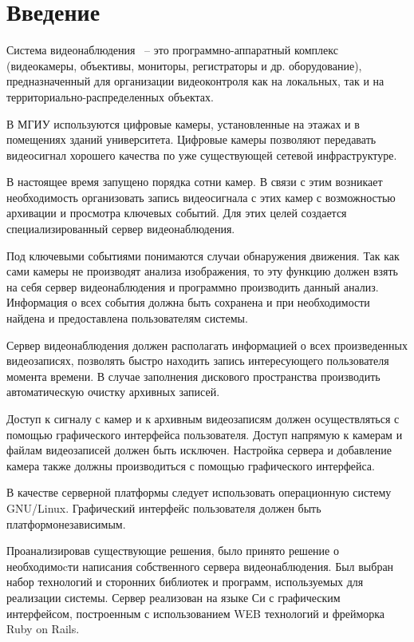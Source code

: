 \chapter*{Введение}

Система видеонаблюдения ~-- это программно-аппаратный комплекс
(видеокамеры, объективы, мониторы, регистраторы и др. оборудование),
предназначенный для организации видеоконтроля как на локальных, так и на
территориально-распределенных объектах.

В МГИУ используются цифровые камеры, установленные на этажах и в помещениях зданий университета.
Цифровые камеры позволяют передавать видеосигнал хорошего качества по уже существующей
сетевой инфраструктуре.

В настоящее время запущено порядка сотни камер. В связи с этим возникает необходимость
организовать запись видеосигнала с этих камер с возможностью архивации и просмотра ключевых событий.
Для этих целей создается специализированный сервер видеонаблюдения.

Под ключевыми событиями понимаются случаи обнаружения движения. Так как сами камеры не производят
анализа изображения, то эту функцию должен взять на себя сервер видеонаблюдения и программно
производить данный анализ. Информация о всех события должна быть сохранена и при необходимости
найдена и предоставлена пользователям системы.

Сервер видеонаблюдения должен располагать информацией о всех произведенных видеозаписях,
позволять быстро находить запись интересующего пользователя момента времени. В случае заполнения
дискового пространства производить автоматическую очистку архивных записей.

Доступ к сигналу с камер и к архивным видеозаписям должен осуществляться с помощью графического
интерфейса пользователя. Доступ напрямую к камерам и файлам видеозаписей должен быть исключен.
Настройка сервера и добавление камера также должны производиться с помощью графического интерфейса.

В качестве серверной платформы следует использовать операционную систему GNU/Linux.
Графический интерфейс пользователя должен быть платформонезависимым.

Проанализировав существующие решения, было принято решение о необходимоcти написания
собственного сервера видеонаблюдения. Был выбран набор технологий и сторонних библиотек и программ,
используемых для реализации системы. Сервер реализован на языке Си с графическим интерфейсом,
построенным с использованием WEB технологий и фрейморка Ruby on Rails.
